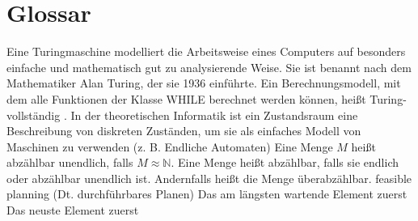 \chapter{Glossar}

		{Eine Turingmaschine modelliert die Arbeitsweise eines Computers auf besonders einfache und mathematisch gut zu analysierende Weise. Sie ist benannt nach dem Mathematiker Alan Turing, der sie 1936 einführte\cite{wiki:01}.  }
			{\grqq Ein Berechnungsmodell, mit dem alle Funktionen
	der Klasse WHILE berechnet werden können, heißt
	Turing-vollständig \cite[Definition 5.4]{Schmitz:19}.\grqq{}}
			{In der theoretischen Informatik ist ein Zustandsraum eine Beschreibung von diskreten Zuständen, um sie als einfaches Modell von Maschinen zu verwenden (z. B. Endliche Automaten)\cite{wiki:02}}
	{Eine Menge $M$ heißt abzählbar unendlich, falls $M \approx \mathbb{N}$. Eine Menge heißt abzählbar, falls sie endlich oder abzählbar unendlich ist. Andernfalls heißt die Menge	überabzählbar\cite[Definititon 5.8]{Schmitz:19}.}
 {feasible planning (Dt. durchführbares Planen)}
 {Das am längsten wartende Element zuerst}
 {Das neuste Element zuerst}
